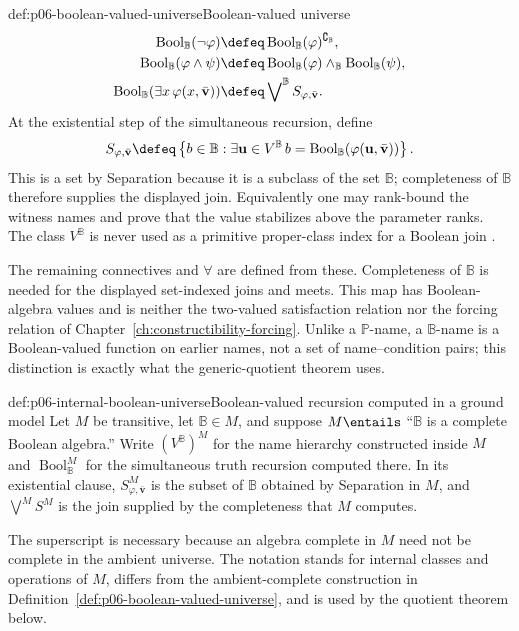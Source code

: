 \begin{hbdefinition}{def:p06-boolean-valued-universe}{Boolean-valued universe}
\[\begin{aligned}
 \operatorname{Bool}_{\mathbb B}(\neg\varphi)
   &\defeq
     \operatorname{Bool}_{\mathbb B}(\varphi)^{\complement_{\mathbb B}},\\
 \operatorname{Bool}_{\mathbb B}(\varphi\wedge\psi)
   &\defeq\operatorname{Bool}_{\mathbb B}(\varphi)\wedge_{\mathbb B}
       \operatorname{Bool}_{\mathbb B}(\psi),\\
 \operatorname{Bool}_{\mathbb B}(\exists x\,\varphi(x,\bar{\mathbf v}))
   &\defeq\mathop{\bigvee}\nolimits^{\mathbb B}
       S_{\varphi,\bar{\mathbf v}}.
\end{aligned}
\]
At the existential step of the simultaneous recursion, define
\[
 S_{\varphi,\bar{\mathbf v}}
 \defeq
 \left\{b\in\mathbb B:
   \exists\mathbf u\in V^{\mathbb B}\,
   b=\operatorname{Bool}_{\mathbb B}
      (\varphi(\mathbf u,\bar{\mathbf v}))\right\}.
\]
This is a set by Separation because it is a subclass of the set
\(\mathbb B\); completeness of \(\mathbb B\) therefore supplies the displayed
join.  Equivalently one may rank-bound the witness names and prove that the
value stabilizes above the parameter ranks.  The class
\(V^{\mathbb B}\) is never used as a primitive proper-class index for a
Boolean join \cite{ScottSolovay1967,Bell2005}.

The remaining connectives and \(\forall\) are defined from these.  Completeness
of \(\mathbb B\) is needed for the displayed set-indexed joins and meets.  This map has
Boolean-algebra values and is neither the two-valued satisfaction relation nor
the forcing relation of Chapter~\ref{ch:constructibility-forcing}.  Unlike
a \(\mathbb P\)-name, a \(\mathbb B\)-name is a Boolean-valued function on
earlier names, not a set of name--condition pairs; this distinction is exactly
what the generic-quotient theorem uses.
\end{hbdefinition}

\begin{hbconvention}{def:p06-internal-boolean-universe}{Boolean-valued recursion computed in a ground model}
Let \(M\) be transitive, let \(\mathbb B\in M\), and suppose
\(M\entails\) “\(\mathbb B\) is a complete Boolean algebra.”  Write
\((V^{\mathbb B})^M\) for the name hierarchy constructed inside \(M\) and
\(\operatorname{Bool}_{\mathbb B}^M\) for the simultaneous truth recursion
computed there.  In its existential clause,
\(S_{\varphi,\bar{\mathbf v}}^M\) is the subset of \(\mathbb B\) obtained by
Separation in \(M\), and \(\bigvee^M S^M\) is the join supplied by the
completeness that \(M\) computes.

The superscript is necessary because an algebra complete in \(M\) need not be
complete in the ambient universe.  The notation stands for internal classes
and operations of \(M\), differs from the ambient-complete construction in
Definition~\ref{def:p06-boolean-valued-universe}, and is used by the quotient
theorem below.
\end{hbconvention}

